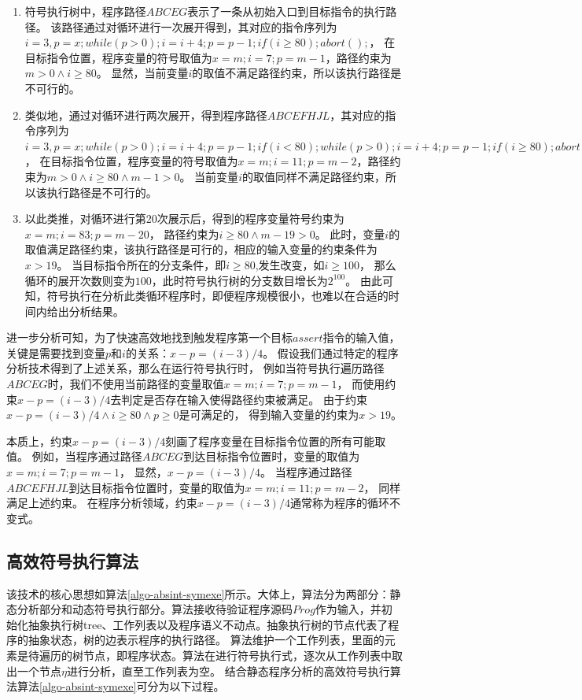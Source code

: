 \begin{enumerate}
\item 符号执行树中，程序路径$ABCEG$表示了一条从初始入口到目标指令的执行路径。
该路径通过对循环进行一次展开得到，其对应的指令序列为
$i=3,p=x;while(p>0);i=i+4;p=p-1;if(i\geq 80);abort();$，
在目标指令位置，程序变量的符号取值为$x=m;i=7;p=m-1$，路径约束为$m>0\wedge i\geq 80$。
显然，当前变量$i$的取值不满足路径约束，所以该执行路径是不可行的。
\item 类似地，通过对循环进行两次展开，得到程序路径$ABCEFHJL$，其对应的指令序列为
$i=3,p=x;while(p>0);i=i+4;p=p-1;if(i < 80);while(p>0);i=i+4;p=p-1;if(i\geq 80);abort()$，
在目标指令位置，程序变量的符号取值为$x=m;i=11;p=m-2$，路径约束为$m>0\wedge i\geq 80 \wedge m-1>0$。
当前变量$i$的取值同样不满足路径约束，所以该执行路径是不可行的。
\item 以此类推，对循环进行第20次展示后，得到的程序变量符号约束为$x=m;i=83;p=m-20$，
路径约束为$i\geq 80 \wedge m-19>0$。
此时，变量$i$的取值满足路径约束，该执行路径是可行的，相应的输入变量的约束条件为$x>19$。
当目标指令所在的分支条件，即$i\geq 80$,发生改变，如$i\geq 100$，
那么循环的展开次数则变为$100$，此时符号执行树的分支数目增长为$2^{100}$。
由此可知，符号执行在分析此类循环程序时，即便程序规模很小，也难以在合适的时间内给出分析结果。
\end{enumerate}

进一步分析可知，为了快速高效地找到触发程序第一个目标$assert$指令的输入值，
关键是需要找到变量$p$和$i$的关系：$x-p = (i-3)/4$。
假设我们通过特定的程序分析技术得到了上述关系，那么在运行符号执行时，
例如当符号执行遍历路径$ABCEG$时，我们不使用当前路径的变量取值$x=m;i=7;p=m-1$，
而使用约束$x-p = (i-3)/4$去判定是否存在输入使得路径约束被满足。
由于约束$x-p = (i-3)/4 \wedge i\geq 80 \wedge p \geq 0$是可满足的，
得到输入变量的约束为$x>19$。

本质上，约束$x-p = (i-3)/4$刻画了程序变量在目标指令位置的所有可能取值。
例如，当程序通过路径$ABCEG$到达目标指令位置时，变量的取值为$x=m;i=7;p=m-1$，
显然，$x-p = (i-3)/4$。
当程序通过路径$ABCEFHJL$到达目标指令位置时，变量的取值为$x=m;i=11;p=m-2$，
同样满足上述约束。
在程序分析领域，约束$x-p = (i-3)/4$通常称为程序的循环不变式。


\subsection{高效符号执行算法}

该技术的核心思想如算法\ref{algo-absint-symexe}所示。大体上，算法分为两部分：静态分析部分和动态符号执行部分。算法接收待验证程序源码$Prog$作为输入，并初始化抽象执行树tree、工作列表以及程序语义不动点。抽象执行树的节点代表了程序的抽象状态，树的边表示程序的执行路径。
算法维护一个工作列表，里面的元素是待遍历的树节点，即程序状态。算法在进行符号执行式，逐次从工作列表中取出一个节点$\eta$进行分析，直至工作列表为空。
结合静态程序分析的高效符号执行算法算法\ref{algo-absint-symexe}可分为以下过程。


